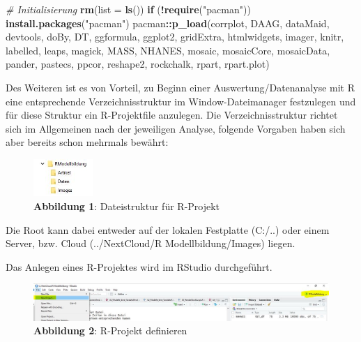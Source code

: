 \documentclass[]{article}
\newenvironment{Shaded}{\begin{snugshade}}{\end{snugshade}}
\newcommand{\CommentTok}[1]{\textcolor[rgb]{0.56,0.35,0.01}{\textit{#1}}}
\newcommand{\ControlFlowTok}[1]{\textcolor[rgb]{0.13,0.29,0.53}{\textbf{#1}}}
\newcommand{\DataTypeTok}[1]{\textcolor[rgb]{0.13,0.29,0.53}{#1}}
\newcommand{\KeywordTok}[1]{\textcolor[rgb]{0.13,0.29,0.53}{\textbf{#1}}}
\newcommand{\NormalTok}[1]{#1}
\newcommand{\OperatorTok}[1]{\textcolor[rgb]{0.81,0.36,0.00}{\textbf{#1}}}
\newcommand{\StringTok}[1]{\textcolor[rgb]{0.31,0.60,0.02}{#1}}
\begin{document}
\begin{Shaded}
\begin{Highlighting}[]
\CommentTok{# Initialisierung}
\KeywordTok{rm}\NormalTok{(}\DataTypeTok{list =} \KeywordTok{ls}\NormalTok{())}
\ControlFlowTok{if}\NormalTok{ (}\OperatorTok{!}\KeywordTok{require}\NormalTok{(}\StringTok{"pacman"}\NormalTok{)) }\KeywordTok{install.packages}\NormalTok{(}\StringTok{"pacman"}\NormalTok{)}
\NormalTok{pacman}\OperatorTok{::}\KeywordTok{p_load}\NormalTok{(corrplot, DAAG, dataMaid, devtools, doBy, DT, }
\NormalTok{               ggformula, ggplot2, gridExtra, htmlwidgets, }
\NormalTok{               imager, knitr, labelled, leaps, magick, MASS, }
\NormalTok{               NHANES, mosaic, mosaicCore, mosaicData, pander,}
\NormalTok{               pastecs, ppcor, reshape2, }
\NormalTok{               rockchalk, rpart, rpart.plot)}
\end{Highlighting}
\end{Shaded}

Des Weiteren ist es von Vorteil, zu Beginn einer Auswertung/Datenanalyse mit R eine entsprechende Verzeichnisstruktur im Window-Dateimanager festzulegen und für diese Struktur ein R-Projektfile anzulegen. Die Verzeichnisstruktur richtet sich im Allgemeinen nach der jeweiligen Analyse, folgende Vorgaben haben sich aber bereits schon mehrmals bewährt:

\begin{figure}
\centering
\includegraphics[width=0.2\textwidth,height=\textheight]{Images/Verzeichnisstruktur.JPG}
\caption{\textbf{Abbildung 1}: Dateistruktur für R-Projekt}
\end{figure}

Die Root kann dabei entweder auf der lokalen Festplatte (C:/..) oder einem Server, bzw. Cloud (../NextCloud/R Modellbildung/Images) liegen.

Das Anlegen eines R-Projektes wird im RStudio durchgeführt.

\begin{figure}
\centering
\includegraphics[width=1\textwidth,height=\textheight]{Images/Projektdefinieren.JPG}
\caption{\textbf{Abbildung 2}: R-Projekt definieren}
\end{figure}
\end{document}
